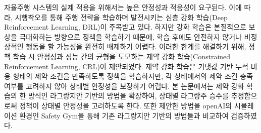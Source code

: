
자율주행 시스템의 실제 적용을 위해서는 높은 안정성과 적응성이 요구된다.
이에 따라, 시행착오를 통해 주행 전략을 학습하며 발전시키는 심층 강화 학습(Deep Reinforcement Learning, DRL)이 주목받고 있다.
하지만 강화 학습은 본질적으로 보상을 극대화하는 방향으로 정책을 학습하기 때문에, 학습 후에도 안전하지 않거나 비정상적인 행동을 할 가능성을 완전히 배제하기 어렵다.
이러한 한계를 해결하기 위해, 정책 학습 시 안정성과 성능 간의 균형을 도모하는 제약 강화 학습(Constrained Reinforcement Learning, CRL)이 제안되었다.
제약 강화 학습은 기댓값 기반 누적 비용 형태의 제약 조건을 만족하도록 정책을 학습하지만, 각 상태에서의 제약 조건 충족 여부를 고려하지 않아 상태별 안정성을 보장하기 어렵다.
본 논문에서는 제약 강화 학습의 한 방식인 라그랑지안 기반의 방법을 확장하여, 상태별 라그랑주 승수를 추정함으로써 정책이 상태별 안정성을 고려하도록 한다.
또한 제안한 방법을 openAI의 시뮬레이션 환경인 Safety Gym을 통해 기존 라그랑지안 기반의 방법들과 비교하여 검증하였다.